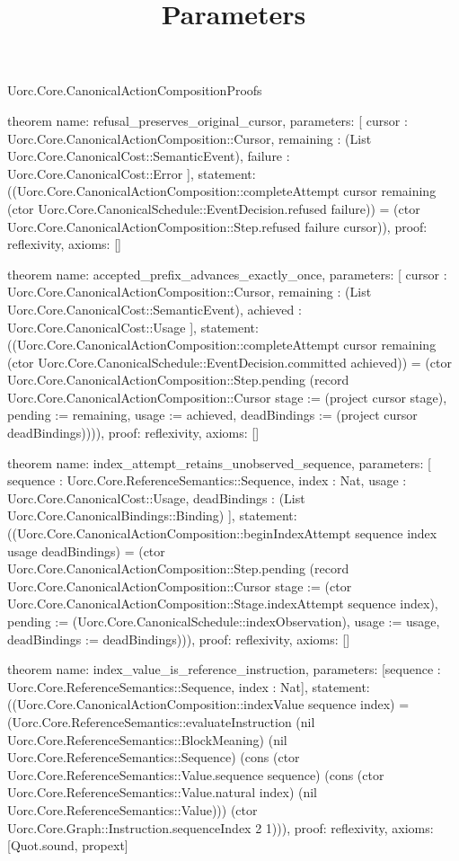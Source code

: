 \begin{lexlean}{Uorc.Core.CanonicalActionCompositionProofs}
\title{Parameters}
\begin{semanticmodule}
theorem{
  name: refusal_preserves_original_cursor,
  parameters: [
    cursor : Uorc.Core.CanonicalActionComposition::Cursor,
    remaining : (List Uorc.Core.CanonicalCost::SemanticEvent),
    failure : Uorc.Core.CanonicalCost::Error
  ],
  statement: ((Uorc.Core.CanonicalActionComposition::completeAttempt cursor remaining (ctor Uorc.Core.CanonicalSchedule::EventDecision.refused failure)) = (ctor Uorc.Core.CanonicalActionComposition::Step.refused failure cursor)),
  proof: reflexivity{},
  axioms: []
}

theorem{
  name: accepted_prefix_advances_exactly_once,
  parameters: [
    cursor : Uorc.Core.CanonicalActionComposition::Cursor,
    remaining : (List Uorc.Core.CanonicalCost::SemanticEvent),
    achieved : Uorc.Core.CanonicalCost::Usage
  ],
  statement: ((Uorc.Core.CanonicalActionComposition::completeAttempt cursor remaining (ctor Uorc.Core.CanonicalSchedule::EventDecision.committed achieved)) = (ctor Uorc.Core.CanonicalActionComposition::Step.pending (record Uorc.Core.CanonicalActionComposition::Cursor {stage := (project cursor stage), pending := remaining, usage := achieved, deadBindings := (project cursor deadBindings)}))),
  proof: reflexivity{},
  axioms: []
}

theorem{
  name: index_attempt_retains_unobserved_sequence,
  parameters: [
    sequence : Uorc.Core.ReferenceSemantics::Sequence,
    index : Nat,
    usage : Uorc.Core.CanonicalCost::Usage,
    deadBindings : (List Uorc.Core.CanonicalBindings::Binding)
  ],
  statement: ((Uorc.Core.CanonicalActionComposition::beginIndexAttempt sequence index usage deadBindings) = (ctor Uorc.Core.CanonicalActionComposition::Step.pending (record Uorc.Core.CanonicalActionComposition::Cursor {stage := (ctor Uorc.Core.CanonicalActionComposition::Stage.indexAttempt sequence index), pending := (Uorc.Core.CanonicalSchedule::indexObservation), usage := usage, deadBindings := deadBindings}))),
  proof: reflexivity{},
  axioms: []
}

theorem{
  name: index_value_is_reference_instruction,
  parameters: [sequence : Uorc.Core.ReferenceSemantics::Sequence, index : Nat],
  statement: ((Uorc.Core.CanonicalActionComposition::indexValue sequence index) = (Uorc.Core.ReferenceSemantics::evaluateInstruction (nil Uorc.Core.ReferenceSemantics::BlockMeaning) (nil Uorc.Core.ReferenceSemantics::Sequence) (cons (ctor Uorc.Core.ReferenceSemantics::Value.sequence sequence) (cons (ctor Uorc.Core.ReferenceSemantics::Value.natural index) (nil Uorc.Core.ReferenceSemantics::Value))) (ctor Uorc.Core.Graph::Instruction.sequenceIndex 2 1))),
  proof: reflexivity{},
  axioms: [Quot.sound, propext]
}


\end{semanticmodule}
\end{lexlean}
